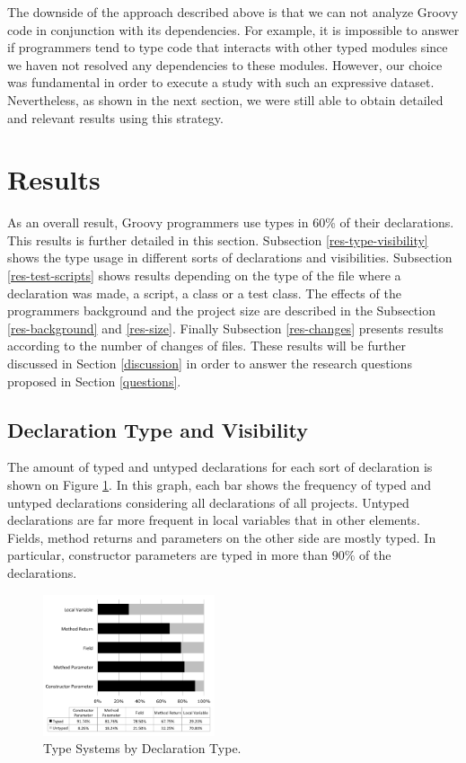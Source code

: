 \documentclass[preprint]{sigplanconf}
\begin{document}
The downside of the approach described above is that we can not analyze Groovy code in conjunction with its dependencies. 
For example, it is impossible to answer if programmers tend to type code that interacts with other typed modules since we haven not resolved any dependencies to these modules.
However, our choice was fundamental in order to execute a study with such an expressive dataset.
Nevertheless, as shown in the next section, we were still able to obtain detailed and relevant results using this strategy.











%
%
\section{Results\label{results}}
As an overall result, Groovy programmers use types in 60\% of their declarations.
This results is further detailed in this section.
Subsection \ref{res-type-visibility} shows the type usage in different sorts of declarations and visibilities.
Subsection \ref{res-test-scripts} shows results depending on the type of the file where a declaration was made, a script, a class or a test class.
The effects of the programmers background and the project size are described in the Subsection \ref{res-background} and \ref{res-size}.
Finally Subsection \ref{res-changes} presents results according to the number of changes of files.
These results will be further discussed in Section \ref{discussion} in order to answer the research questions proposed in Section \ref{questions}.

\subsection{Declaration Type and Visibility\label{res-type-visibility}}
The amount of typed and untyped declarations for each sort of declaration is shown on Figure \ref{fig:tipo_declaracao}.
In this graph, each bar shows the frequency of typed and untyped declarations considering all declarations of all projects.
Untyped declarations are far more frequent in local variables that in other elements.
Fields, method returns and parameters on the other side are mostly typed. In particular, constructor parameters are typed in more than $90\%$ of the declarations.

\begin{figure}[h]
\centering 
\includegraphics[width=0.45\textwidth]{type} 
\caption{Type Systems by Declaration Type.}
\label{fig:tipo_declaracao} 
\end{figure}
\end{document}
